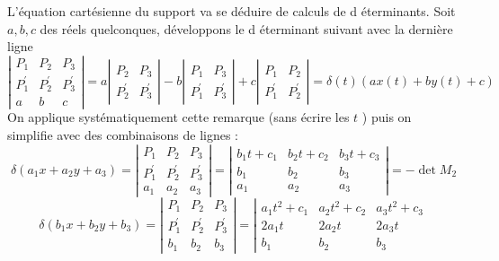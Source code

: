 \begin{description}
\begin{description}
L'\'{e}quation cart\'{e}sienne du support va se d\'{e}duire de calculs de d%
\'{e}terminants. Soit $a,b,c$ des r\'{e}els quelconques, d\'{e}veloppons le d%
\'{e}terminant suivant avec la derni\`{e}re ligne
\[
\left| 
\begin{array}{ccc}
P_{1} & P_{2} & P_{3} \\ 
P_{1}^{\prime } & P_{2}^{\prime } & P_{3}^{\prime } \\ 
a & b & c
\end{array}
\right| =a\left| 
\begin{array}{cc}
P_{2} & P_{3} \\ 
P_{2}^{\prime } & P_{3}^{\prime }
\end{array}
\right| -b\left| 
\begin{array}{cc}
P_{1} & P_{3} \\ 
P_{1}^{\prime } & P_{3}^{\prime }
\end{array}
\right| +c\left| 
\begin{array}{cc}
P_{1} & P_{2} \\ 
P_{1}^{\prime } & P_{2}^{\prime }
\end{array}
\right| =\delta (t)\left( ax(t)+by(t)+c\right) 
\]
On applique syst\'{e}matiquement cette remarque (sans \'{e}crire les $t$ )
puis on simplifie avec des combinaisons de lignes :
\[
\delta (a_{1}x+a_{2}y+a_{3})=\left| 
\begin{array}{ccc}
P_{1} & P_{2} & P_{3} \\ 
P_{1}^{\prime } & P_{2}^{\prime } & P_{3}^{\prime } \\ 
a_{1} & a_{2} & a_{3}
\end{array}
\right| =\left| 
\begin{array}{ccc}
b_{1}t+c_{1} & b_{2}t+c_{2} & b_{3}t+c_{3} \\ 
b_{1} & b_{2} & b_{3} \\ 
a_{1} & a_{2} & a_{3}
\end{array}
\right| =-\det M_{2}
\]
\[
\delta (b_{1}x+b_{2}y+b_{3})=\left| 
\begin{array}{ccc}
P_{1} & P_{2} & P_{3} \\ 
P_{1}^{\prime } & P_{2}^{\prime } & P_{3}^{\prime } \\ 
b_{1} & b_{2} & b_{3}
\end{array}
\right| =\left| 
\begin{array}{ccc}
a_{1}t^{2}+c_{1} & a_{2}t^{2}+c_{2} & a_{3}t^{2}+c_{3} \\ 
2a_{1}t & 2a_{2}t & 2a_{3}t \\ 
b_{1} & b_{2} & b_{3}

\end{array}\]
\end{description}
\end{description}

